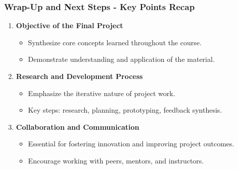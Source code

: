 \documentclass[aspectratio=169]{beamer}
\begin{document}
\begin{frame}[fragile]
    \frametitle{Wrap-Up and Next Steps - Key Points Recap}
    \begin{enumerate}
        \item \textbf{Objective of the Final Project}
        \begin{itemize}
            \item Synthesize core concepts learned throughout the course.
            \item Demonstrate understanding and application of the material.
        \end{itemize}
        
        \item \textbf{Research and Development Process}
        \begin{itemize}
            \item Emphasize the iterative nature of project work.
            \item Key steps: research, planning, prototyping, feedback synthesis.
        \end{itemize}
        
        \item \textbf{Collaboration and Communication}
        \begin{itemize}
            \item Essential for fostering innovation and improving project outcomes.
            \item Encourage working with peers, mentors, and instructors.
        \end{itemize}
    \end{enumerate}
\end{frame}
\end{document}
